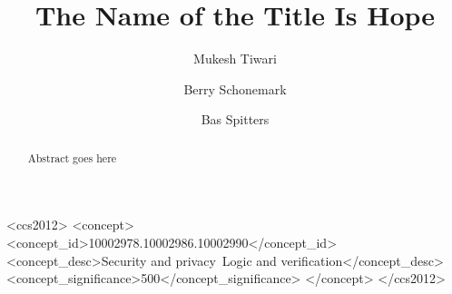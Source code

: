 \documentclass[sigconf]{acmart}
\begin{document}
\title{The Name of the Title Is Hope}


\author{Mukesh Tiwari}

\author{Berry Schonemark}



\author{Bas Spitters}

\renewcommand{\shortauthors}{Tiwari et al.}

\begin{abstract}
  Abstract goes here
\end{abstract}


\begin{CCSXML}
<ccs2012>
  <concept>
      <concept_id>10002978.10002986.10002990</concept_id>
      <concept_desc>Security and privacy~Logic and verification</concept_desc>
      <concept_significance>500</concept_significance>
      </concept>
</ccs2012>
\end{CCSXML}
  

\end{document}
